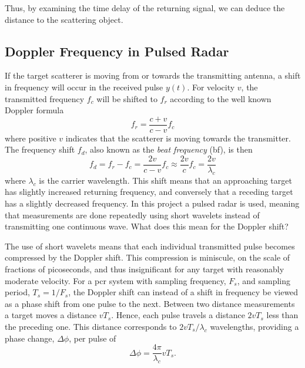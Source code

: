 Thus, by examining the time delay of the returning signal, we can deduce the distance to the scattering object. 

\subsection{Doppler Frequency in Pulsed Radar}\label{sec:doppler}
\label{doppler}

If the target scatterer is moving from or towards the transmitting antenna, a shift in frequency will occur in the received pulse $y(t)$. For velocity $v$, the transmitted frequency $f_c$ will be shifted to $f_r$ according to the well known Doppler formula \citep{ridenour_1947}
\begin{equation}
	f_r = \frac{c + v}{c - v}f_c
\end{equation}
where positive $v$ indicates that the scatterer is moving towards the transmitter. The frequency shift $f_d$, also known as the \emph{beat frequency} (\gls{bf}), is then
\begin{equation}\label{eq:dshift}
	f_d 
	= f_r - f_c 
	= \frac{2v}{c-v}f_c \approx \frac{2v}{c}f_c 
	= \frac{2v}{\lambda_c}
\end{equation}
where $\lambda_c$ is the carrier wavelength. This shift means that an approaching target has slightly increased returning frequency, and conversely that a receding target has a slightly decreased frequency. In this project a pulsed radar is used, meaning that measurements are done repeatedly using short wavelets instead of transmitting one continuous wave. What does this mean for the Doppler shift?

The use of short wavelets means that each individual transmitted pulse becomes compressed by the Doppler shift. This compression is miniscule, on the scale of fractions of picoseconds, and thus insignificant for any target with reasonably moderate velocity. For a \gls{pcr} system with sampling frequency, $F_s$, and sampling period, $T_s = 1/F_s$, the Doppler shift can instead of a shift in frequency be viewed as a phase shift from one pulse to the next. Between two distance measurements a target moves a distance $vT_s$. Hence, each pulse travels a distance $2vT_s$ less than the preceding one. This distance corresponds to $2vT_s/\lambda_c$ wavelengths, providing a phase change, $\Delta \phi$, per pulse of
\begin{equation}
	\Delta \phi = \frac{4\pi}{\lambda_c}vT_s.
\end{equation}

